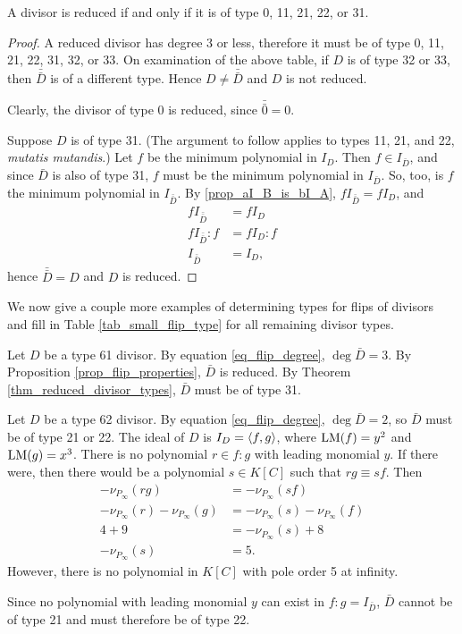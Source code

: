 \begin{theorem}
  \label{thm_reduced_divisor_types}
  A divisor is reduced if and only if it is of type 0, 11, 21, 22, or 31.
\end{theorem}
\begin{proof}
  A reduced divisor has degree 3 or less, therefore it must be of type 0, 11, 21, 22, 31, 32, or 33.
  On examination of the above table, if $D$ is of type 32 or 33, then $\bar{\bar D}$ is of a different type.
  Hence $D \neq \bar{\bar D}$ and $D$ is not reduced.
  
  Clearly, the divisor of type 0 is reduced, since $\bar{\bar 0} = 0$.
  
  Suppose $D$ is of type 31.
  (The argument to follow applies to types 11, 21, and 22, \emph{mutatis mutandis}.)
  Let $f$ be the minimum polynomial in $I_D$.
  Then $f \in I_{\bar D}$, and since $\bar D$ is also of type 31, $f$ must be the minimum polynomial in $I_{\bar D}$.
  So, too, is $f$ the minimum polynomial in $I_{\bar{\bar D}}$.
  By \ref{prop_aI_B_is_bI_A}, $f I_{\bar{\bar D}} = f I_D$, and
  \begin{align*}
    f I_{\bar{\bar D}} &= f I_D \\
    f I_{\bar{\bar D}} : f &= f I_D : f \\
    I_{\bar{\bar D}} &= I_D,
  \end{align*}
  hence $\bar{\bar D} = D$ and $D$ is reduced.
\end{proof}

We now give a couple more examples of determining types for flips of divisors
and fill in Table \ref{tab_small_flip_type} for all remaining divisor types.

\begin{example}
  Let $D$ be a type 61 divisor.
  By equation \ref{eq_flip_degree}, $\deg \bar D = 3$.
  By Proposition \ref{prop_flip_properties}, $\bar D$ is reduced.
  By Theorem \ref{thm_reduced_divisor_types}, $\bar D$ must be of type 31.
\end{example}
\begin{example}
  Let $D$ be a type 62 divisor.
  By equation \ref{eq_flip_degree}, $\deg \bar D = 2$, so $\bar D$ must be of type 21 or 22.
  The ideal of $D$ is $I_D = \left\langle f,g \right\rangle$,
  where $\operatorname{LM}(f) = y^2$ and $\operatorname{LM}(g) = x^3$.
  There is no polynomial $r \in f : g$ with leading monomial $y$.
  If there were, then there would be a polynomial $s \in K[C]$ such that $rg \equiv sf$. Then
  \begin{align*}
    -\nu_{P_\infty}(rg) &= -\nu_{P_\infty}(sf) \\
    -\nu_{P_\infty}(r) - \nu_{P_\infty}(g) &= -\nu_{P_\infty}(s) - \nu_{P_\infty}(f) \\
    4 + 9 &= -\nu_{P_\infty}(s) + 8 \\
    -\nu_{P_\infty}(s) &= 5.
  \end{align*}
  However, there is no polynomial in $K[C]$ with pole order 5 at infinity.
  
  Since no polynomial with leading monomial $y$ can exist in $f : g = I_{\bar D}$,
  $\bar D$ cannot be of type 21 and must therefore be of type 22.
\end{example}

